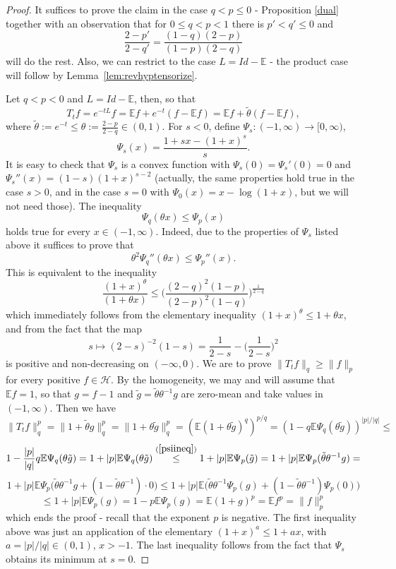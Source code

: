 \documentclass[11pt]{amsart}
\newcommand{\E}{\mathbb{E}}
\newcommand{\1}{\mathbf{1}}
\def\E{{\mathbb E}}
\def\H{{\mathcal{H}}}
\theoremstyle{definition}
\theoremstyle{plain}
\theoremstyle{remark}
\numberwithin{equation}{section}
\begin{document}
\begin{proof}
It suffices to prove the claim in the case $q<p \leq 0$ - Proposition \ref{dual} together with an observation that for $0 \leq q<p<1$ there is $p'<q' \leq 0$ and
\[
\frac{2-p'}{2-q'}=\frac{(1-q)(2-p)}{(1-p)(2-q)}
\]
will do the rest. Also, we can restrict to the case $L=Id-\E$
- the product case will follow by Lemma~\ref{lem:revhyptensorize}.

Let $q<p<0$ and $L=Id-\E$, then, so that
\[
T_{t}f=e^{-tL}f=\E f +e^{-t}(f-\E f)=
\E f+\tilde{\theta}(f- \E f),
\]
where $\tilde{\theta}:=e^{-t} \leq \theta:=\frac{2-p}{2-q} \in (0,1)$. For $s<0$, define
$\Psi_{s}: (-1,\infty) \rightarrow [0,\infty)$,
\[
\Psi_{s}(x)=\frac{1+sx-(1+x)^{s}}{s}.
\]
It is easy to check that $\Psi_{s}$ is a convex function
with $\Psi_{s}(0)=\Psi_{s}'(0)=0$ and
$\Psi_{s}''(x)=(1-s)(1+x)^{s-2}$ (actually, the same properties hold true in the case $s>0$, and in the case $s=0$
with $\Psi_{0}(x)=x-\log(1+x)$, but we will not need those).
The inequality
\begin{equation} \label{psiineq}
\Psi_{q}(\theta x) \leq \Psi_{p}(x)
\end{equation}
holds true for every $x \in (-1,\infty)$. Indeed, due to the
properties of $\Psi_{s}$ listed above it suffices to prove that
\begin{equation} \label{intermed}
\theta^{2}\Psi_{q}''(\theta x) \leq \Psi_{p}''(x).
\end{equation}
This is equivalent to the inequality
\begin{equation}\label{ineq:key_simple_semigr}
\frac{(1+x)^{\theta}}{(1+\theta x)} \leq
\Big(\frac{(2-q)^{2}(1-p)}{(2-p)^{2}(1-q)}\Big)^{\frac{1}
{2-q}}
\end{equation}
which immediately follows from the elementary inequality
$(1+x)^{\theta} \leq 1+\theta x$, and from the fact that
the map
\[
s \mapsto (2-s)^{-2}(1-s)=\frac{1}{2-s}-
\Big(\frac{1}{2-s}\Big)^{2}
\]
is positive and non-decreasing on $(-\infty,0)$.
We are to prove $\| T_{t}f\|_{q} \geq \| f\|_{p}$ for every positive $f \in \H$. By the homogeneity, we may and will assume that $\E f=1$, so that $g=f-1$ and
$\tilde{g}=\tilde{\theta}\theta^{-1}g$ are zero-mean and take values in $(-1, \infty)$. Then we have
\[
\| T_{t}f\|_{q}^{p}=\| 1+\tilde{\theta}g\|_{q}^{p}=
\| 1+\theta \tilde{g}\|_{q}^{p}=
(\E (1+\theta \tilde{g})^{q})^{p/q}=
(1-q\E \Psi_{q}(\theta \tilde{g}))^{|p|/|q|} \leq
\]
\[
1-\frac{|p|}{|q|}q\E \Psi_{q}(\theta \tilde{g})=
1+|p|\E \Psi_{q}(\theta \tilde{g})
\stackrel{(\ref{psiineq})}{\leq}
1+|p|\E \Psi_{p}(\tilde{g})=
1+|p|\E \Psi_{p}(\tilde{\theta}\theta^{-1}g)=
\]
\[
1+|p|\E \Psi_{p}\Big(\tilde{\theta}\theta^{-1}g+
(1-\tilde{\theta}\theta^{-1})\cdot 0\Big) \leq
1+|p|\E \Big(\tilde{\theta}\theta^{-1}\Psi_{p}(g)+
(1-\tilde{\theta}\theta^{-1})\Psi_{p}(0)\Big)
\]
\[
\leq
1+|p|\E \Psi_{p}(g)=
1-p\E \Psi_{p}(g)=
\E(1+g)^{p}=\E f^{p}=\| f\|_{p}^{p}
\]
which ends the proof - recall that the exponent $p$ is negative. The first inequality above was just an application
of the elementary $(1+x)^{a} \leq 1+ax$, with $a=|p|/|q| \in (0,1)$, $x>-1$. The last inequality follows from the fact that $\Psi_s$ obtains its minimum at $s=0$. 


\end{proof}
\end{document}
